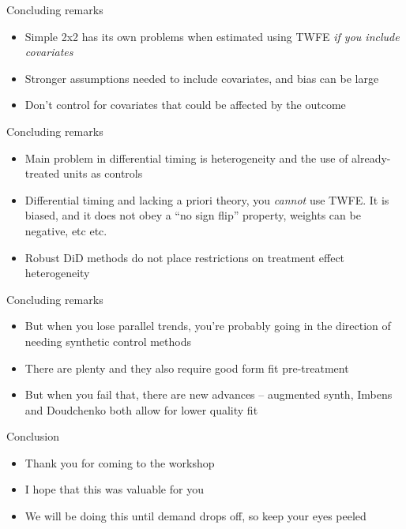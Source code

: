 \documentclass{beamer}
\begin{document}
\begin{frame}{Concluding remarks}

\begin{itemize}
\item Simple 2x2 has its own problems when estimated using TWFE \emph{if you include covariates}
\item Stronger assumptions needed to include covariates, and bias can be large
\item Don't control for covariates that could be affected by the outcome 
\end{itemize}

\end{frame}

\begin{frame}{Concluding remarks}

\begin{itemize}
\item Main problem in differential timing is heterogeneity and the use of already-treated units as controls
\item Differential timing and lacking a priori theory, you \emph{cannot} use TWFE.  It is biased, and it does not obey a ``no sign flip'' property, weights can be negative, etc etc.
\item Robust DiD methods do not place restrictions on treatment effect heterogeneity 
\end{itemize}

\end{frame}

\begin{frame}{Concluding remarks}

\begin{itemize}
\item But when you lose parallel trends, you're probably going in the direction of needing synthetic control methods
\item There are plenty and they also require good form fit pre-treatment
\item But when you fail that, there are new advances -- augmented synth, Imbens and Doudchenko both allow for lower quality fit
\end{itemize}

\end{frame}

\begin{frame}{Conclusion}

\begin{itemize}
\item Thank you for coming to the workshop
\item I hope that this was valuable for you
\item We will be doing this until demand drops off, so keep your eyes peeled
\end{itemize}

\end{frame}
\end{document}
